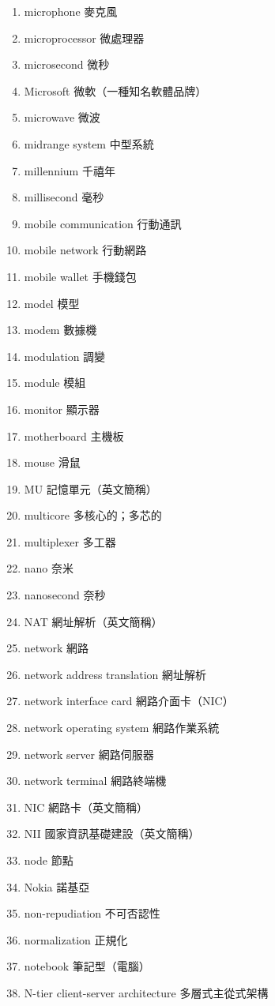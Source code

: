 \begin{enumerate}
  \item microphone 麥克風
  \item microprocessor 微處理器
  \item microsecond 微秒
  \item Microsoft 微軟（一種知名軟體品牌）
  \item microwave 微波
  \item midrange system 中型系統
  \item millennium 千禧年
  \item millisecond 毫秒
  \item mobile communication 行動通訊
  \item mobile network 行動網路
  \item mobile wallet 手機錢包
  \item model 模型
  \item modem 數據機
  \item modulation 調變
  \item module 模組
  \item monitor 顯示器
  \item motherboard 主機板
  \item mouse 滑鼠
  \item MU 記憶單元（英文簡稱）
  \item multicore 多核心的；多芯的
  \item multiplexer 多工器
  \item nano 奈米
  \item nanosecond 奈秒
  \item NAT 網址解析（英文簡稱）
  \item network 網路
  \item network address translation 網址解析
  \item network interface card 網路介面卡（NIC）
  \item network operating system 網路作業系統
  \item network server 網路伺服器
  \item network terminal 網路終端機
  \item NIC 網路卡（英文簡稱）
  \item NII 國家資訊基礎建設（英文簡稱）
  \item node 節點
  \item Nokia 諾基亞
  \item non-repudiation 不可否認性
  \item normalization 正規化
  \item notebook 筆記型（電腦）
  \item N-tier client-server architecture 多層式主從式架構

\end{enumerate}
